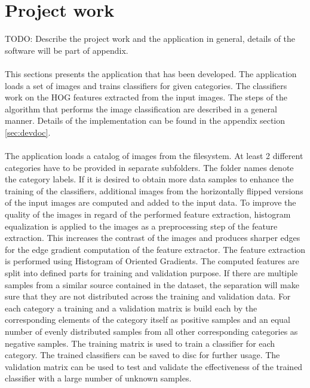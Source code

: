 
\section{Project work}\label{sec:projectwork}

TODO: Describe the project work and the application in general, details of the software will be part of appendix.
\\
\\
This sections presents the application that has been developed. The application loads a set of images and trains classifiers for given categories. The classifiers work on the HOG features extracted from the input images. The steps of the algorithm that performs the image classification are described in a general manner. Details of the implementation can be found in the appendix section \ref{sec:devdoc}.
\\
\\
The application loads a catalog of images from the filesystem. At least 2 different categories have to be provided in separate subfolders. The folder names denote the category labels. If it is desired to obtain more data samples to enhance the training of the classifiers, additional images from the horizontally flipped versions of the input images are computed and added to the input data. To improve the quality of the images in regard of the performed feature extraction, histogram equalization is applied to the images as a preprocessing step of the feature extraction. This increases the contrast of the images and produces sharper edges for the edge gradient computation of the feature extractor. The feature extraction is performed using Histogram of Oriented Gradients. The computed features are split into defined parts for training and validation purpose. If there are multiple samples from a similar source contained in the dataset, the separation will make sure that they are not distributed across the training and validation data. For each category a training and a validation matrix is build each by the corresponding elements of the category itself as positive samples and an equal number of evenly distributed samples from all other corresponding categories as negative samples. The training matrix is used to train a classifier for each category. The trained classifiers can be saved to disc for further usage. The validation matrix can be used to test and validate the effectiveness of the trained classifier with a large number of unknown samples.
